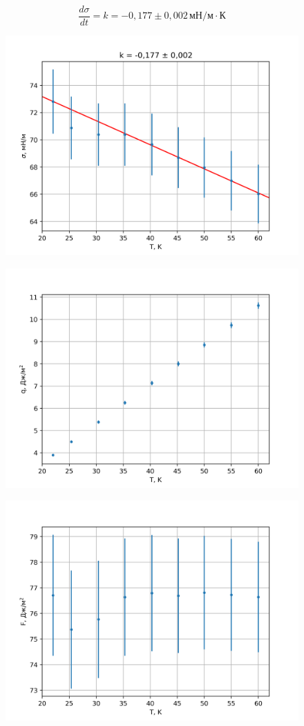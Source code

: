 \[\frac{d\sigma}{dt} = k = -0{,}177\pm0{,}002\,\text{мН}/\text{м}\cdot\text{К}\]

\begin{figure}[ht!]
    \centering\includegraphics[width=0.8\linewidth]{img/plot1.png}
\end{figure}
\begin{figure}[ht!]
    \centering\includegraphics[width=0.8\linewidth]{img/plot2.png}
\end{figure}
\begin{figure}[ht!]
    \centering\includegraphics[width=0.8\linewidth]{img/plot3.png}
\end{figure}

\newpage
~
\newpage